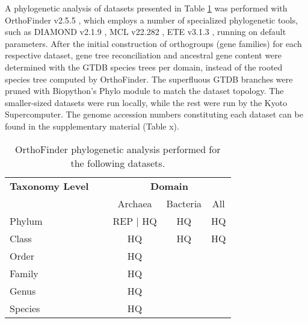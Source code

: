 A phylogenetic analysis of datasets presented in Table \ref{datasets} was performed with OrthoFinder v2.5.5 \cite{emms2019,emms2015}, which employs a number of specialized phylogenetic tools, such as DIAMOND v2.1.9 \cite{buchfink2021}, MCL v22.282 \cite{vandongen2008}, ETE v3.1.3 \cite{huerta-cepas2016}, running on default parameters. After the initial construction of orthogroups (gene families) for each respective dataset, gene tree reconciliation and ancestral gene content were determined with the GTDB species trees per domain, instead of the rooted species tree computed by OrthoFinder. The superfluous GTDB branches were pruned with Biopython's Phylo module to match the dataset topology. The smaller-sized datasets were run locally, while the rest were run by the Kyoto Supercomputer. The genome accession numbers constituting each dataset can be found in the supplementary material (Table x).


\normalsize
\begin{table}
    \centering
    \caption{OrthoFinder phylogenetic analysis performed for \\the following datasets.}
    \label{datasets}
    \begin{tabular}{lcccc}

        \textbf{Taxonomy Level} & ~ & \multicolumn{3}{c}{\textbf{Domain}} \\
        \addlinespace[1.5ex]

        ~ & ~ & Archaea & Bacteria & All \\ 
        \cmidrule{3-5}

        Phylum & ~ & REP | HQ &  HQ & HQ \\ 
        Class & ~ &  HQ &  HQ &  HQ \\ 
        Order & ~ & HQ & ~ & ~ \\ 
        Family & ~ & HQ & ~ & ~ \\ 
        Genus & ~ & HQ & ~ & ~ \\ 
        Species & ~ & HQ & ~ & ~ \\

    \bottomrule
    \end{tabular}
\end{table}


